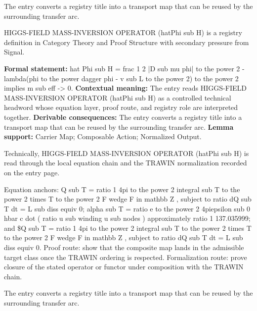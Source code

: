 The entry converts a registry title into a transport map that can be reused by the surrounding transfer arc.
\clearpage


\begingroup\small
{}
HIGGS-FIELD MASS-INVERSION OPERATOR (hatPhi sub H) is a registry definition in Category Theory and Proof Structure with secondary pressure from Signal.

\begingroup\footnotesize\setlength{\emergencystretch}{3em}\sloppy
\textbf{Formal statement:} hat Phi sub H = frac 1 2 |D sub mu phi| to the power 2 - lambda(phi to the power dagger phi - v sub L to the power 2) to the power 2 implies m sub eff -> 0. \textbf{Contextual meaning:} The entry reads HIGGS-FIELD MASS-INVERSION OPERATOR (hatPhi sub H) as a controlled technical headword whose equation layer, proof route, and registry role are interpreted together. \textbf{Derivable consequences:} The entry converts a registry title into a transport map that can be reused by the surrounding transfer arc. \textbf{Lemma support:} Carrier Map; Composable Action; Normalized Output.\par
\endgroup

Technically, HIGGS-FIELD MASS-INVERSION OPERATOR (hatPhi sub H) is read through the local equation chain and the TRAWIN normalization recorded on the entry page.

Equation anchors: Q sub T = ratio 1 4pi to the power 2 integral sub T to the power 2 times T to the power 2 F wedge F in mathbb Z , subject to ratio dQ sub T dt = L sub diss equiv 0; alpha sub T = ratio e to the power 2 4piepsilon sub 0 hbar c dot ( ratio u sub winding u sub nodes ) approximately ratio 1 137.035999; and \$Q sub T = ratio 1 4pi to the power 2 integral sub T to the power 2 times T to the power 2 F wedge F in mathbb Z , subject to ratio dQ sub T dt = L sub diss equiv 0. Proof route: show that the composite map lands in the admissible target class once the TRAWIN ordering is respected. Formalization route: prove closure of the stated operator or functor under composition with the TRAWIN chain.

The entry converts a registry title into a transport map that can be reused by the surrounding transfer arc.
\endgroup

